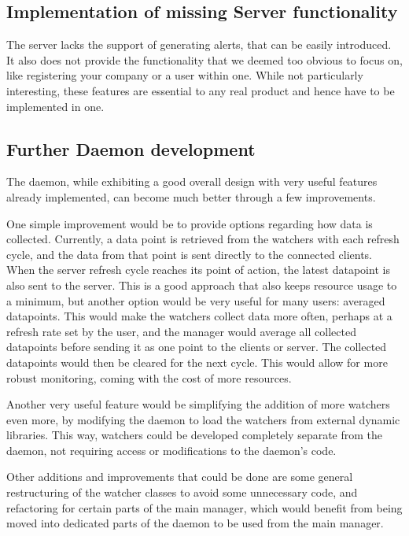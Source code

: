 \documentclass{l3proj}
\begin{document}
\subsection{Implementation of missing Server functionality}

The server lacks the support of generating alerts, that can be easily introduced. It also does not provide the functionality that we deemed too obvious to focus on, like registering your company or a user within one. While not particularly interesting, these features are essential to any real product and hence have to be implemented in one.

\subsection{Further Daemon development}

The daemon, while exhibiting a good overall design with very useful features already implemented, can become much better through a few improvements.

One simple improvement would be to provide options regarding how data is collected. Currently, a data point is retrieved from the watchers with each refresh cycle, and the data from that point is sent directly to the connected clients. When the server refresh cycle reaches its point of action, the latest datapoint is also sent to the server. This is a good approach that also keeps resource usage to a minimum, but another option would be very useful for many users: averaged datapoints. This would make the watchers collect data more often, perhaps at a refresh rate set by the user, and the manager would average all collected datapoints before sending it as one point to the clients or server. The collected datapoints would then be cleared for the next cycle. This would allow for more robust monitoring, coming with the cost of more resources.

Another very useful feature would be simplifying the addition of more watchers even more, by modifying the daemon to load the watchers from external dynamic libraries. This way, watchers could be developed completely separate from the daemon, not requiring access or modifications to the daemon's code.

Other additions and improvements that could be done are some general restructuring of the watcher classes to avoid some unnecessary code, and refactoring for certain parts of the main manager, which would benefit from being moved into dedicated parts of the daemon to be used from the main manager.
\end{document}

